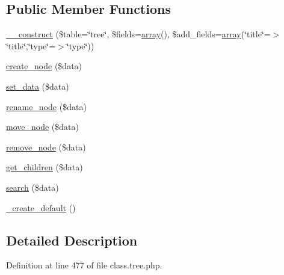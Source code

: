\subsection*{Public Member Functions}
\begin{DoxyCompactItemize}
\item 
\hyperlink{classjson__tree_af584f19c94c86dac1e2ce0c5925e26ad}{\_\-\_\-construct} (\$table=\char`\"{}tree\char`\"{}, \$fields=\hyperlink{list_8php_aa3205d038c7f8feb5c9f01ac4dfadc88}{array}(), \$add\_\-fields=\hyperlink{list_8php_aa3205d038c7f8feb5c9f01ac4dfadc88}{array}(\char`\"{}title\char`\"{}=$>$\char`\"{}title\char`\"{},\char`\"{}type\char`\"{}=$>$\char`\"{}type\char`\"{}))
\item 
\hyperlink{classjson__tree_ac9d9bf3c8445db1706adaff0a4965e25}{create\_\-node} (\$data)
\item 
\hyperlink{classjson__tree_ac896dcdd1535057e14cd62090a252f8f}{set\_\-data} (\$data)
\item 
\hyperlink{classjson__tree_ab8c85249b5295bb65cc7351e6a415906}{rename\_\-node} (\$data)
\item 
\hyperlink{classjson__tree_a9ce104764aac589b3c6faa3336d18a07}{move\_\-node} (\$data)
\item 
\hyperlink{classjson__tree_aa67515e6b060a39b45943138da065883}{remove\_\-node} (\$data)
\item 
\hyperlink{classjson__tree_ad3fd3b76ef6bcc1035c30a0e7a4f65cc}{get\_\-children} (\$data)
\item 
\hyperlink{classjson__tree_a687ec15184ed16cef8b602fbb06c7158}{search} (\$data)
\item 
\hyperlink{classjson__tree_a438616d6ee8d5a957b96f4316934217c}{\_\-create\_\-default} ()
\end{DoxyCompactItemize}


\subsection{Detailed Description}


Definition at line 477 of file class.tree.php.



